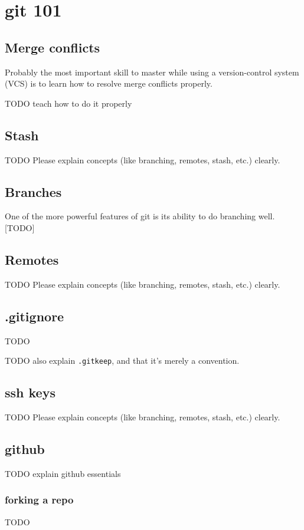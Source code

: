 \documentclass[12pt]{article}
\begin{document}
\section{git 101}
\subsection{Merge conflicts}
Probably the most important skill to master while using a version-control system (VCS) is to learn how to resolve merge conflicts properly.

TODO teach how to do it properly

\subsection{Stash}
TODO
Please explain concepts (like branching, remotes, stash, etc.) clearly.

\subsection{Branches}
One of the more powerful features of git is its ability to do branching well. [TODO]

\subsection{Remotes}
TODO
Please explain concepts (like branching, remotes, stash, etc.) clearly.

\subsection{.gitignore}
TODO

TODO also explain \texttt{.gitkeep}, and that it's merely a convention.


\subsection{ssh keys}
TODO
Please explain concepts (like branching, remotes, stash, etc.) clearly.

\subsection{github}
TODO explain github essentials

\subsubsection{forking a repo}
TODO
\end{document}
